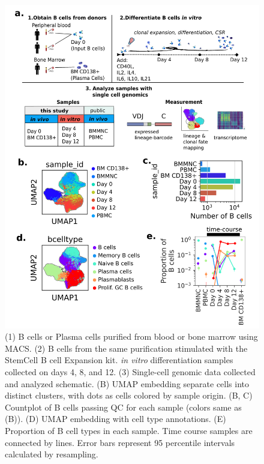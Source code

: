 \begin{figure}[hbt!]
\centering
\includegraphics[width=12cm, keepaspectratio]{figs/paper2/fig1_bcd.png}
\caption[Experimental overview for studying \textit{in vitro} B cell dynamics using integrated single-cell genomics and lineage tracing.]{(1) B cells or Plasma cells purified from blood or bone marrow using MACS. (2) B cells from the same purification stimulated with the StemCell B cell Expansion kit. \textit{in vitro} differentiation samples collected on days 4, 8, and 12. (3) Single-cell genomic data collected and analyzed schematic. (B) UMAP embedding separate cells into distinct clusters, with dots as cells colored by sample origin. (B, C) Countplot of B cells passing QC for each sample (colors same as (B)). (D) UMAP embedding with cell type annotations. (E) Proportion of B cell types in each sample. Time course samples are connected by lines. Error bars represent 95 percentile intervals calculated by resampling.}
\label{fig:paper2_fig_1}
\end{figure}

